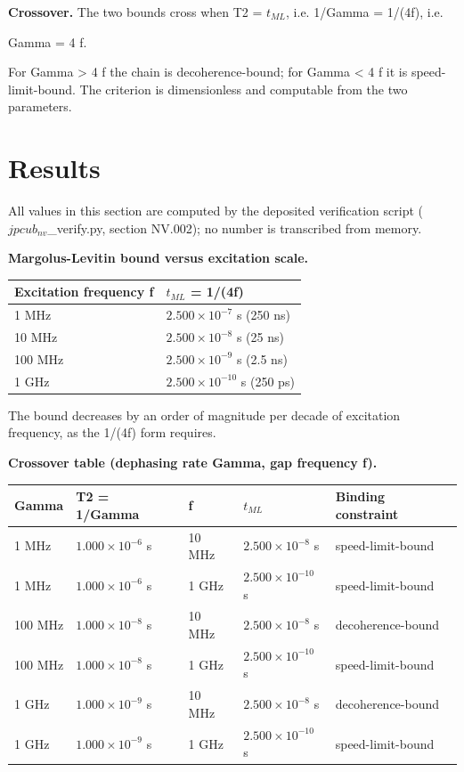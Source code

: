 \documentclass[11pt]{article}
\begin{document}
\textbf{Crossover.} The two bounds cross when T2 = $t_{ML}$, i.e. 1/Gamma = 1/(4f), i.e.

Gamma = 4 f.

For Gamma > 4 f the chain is decoherence-bound; for Gamma < 4 f it is speed-limit-bound. The criterion is dimensionless and computable from the two parameters.

\section{Results}
All values in this section are computed by the deposited verification script ($jpcub_{nv}$\_verify.py, section NV.002); no number is transcribed from memory.

\textbf{Margolus-Levitin bound versus excitation scale.}

\begin{table}[h]
\centering
\begin{tabular}{ll}
\toprule
Excitation frequency f & $t_{ML}$ = 1/(4f) \\
\midrule
1 MHz & $2.500\times 10^{-7}$ s (250 ns) \\
10 MHz & $2.500\times 10^{-8}$ s (25 ns) \\
100 MHz & $2.500\times 10^{-9}$ s (2.5 ns) \\
1 GHz & $2.500\times 10^{-10}$ s (250 ps) \\
\bottomrule
\end{tabular}
\end{table}

The bound decreases by an order of magnitude per decade of excitation frequency, as the 1/(4f) form requires.

\textbf{Crossover table (dephasing rate Gamma, gap frequency f).}

\begin{table}[h]
\centering
\begin{tabular}{lllll}
\toprule
Gamma & T2 = 1/Gamma & f & $t_{ML}$ & Binding constraint \\
\midrule
1 MHz & $1.000\times 10^{-6}$ s & 10 MHz & $2.500\times 10^{-8}$ s & speed-limit-bound \\
1 MHz & $1.000\times 10^{-6}$ s & 1 GHz & $2.500\times 10^{-10}$ s & speed-limit-bound \\
100 MHz & $1.000\times 10^{-8}$ s & 10 MHz & $2.500\times 10^{-8}$ s & decoherence-bound \\
100 MHz & $1.000\times 10^{-8}$ s & 1 GHz & $2.500\times 10^{-10}$ s & speed-limit-bound \\
1 GHz & $1.000\times 10^{-9}$ s & 10 MHz & $2.500\times 10^{-8}$ s & decoherence-bound \\
1 GHz & $1.000\times 10^{-9}$ s & 1 GHz & $2.500\times 10^{-10}$ s & speed-limit-bound \\
\bottomrule
\end{tabular}
\end{table}
\end{document}
